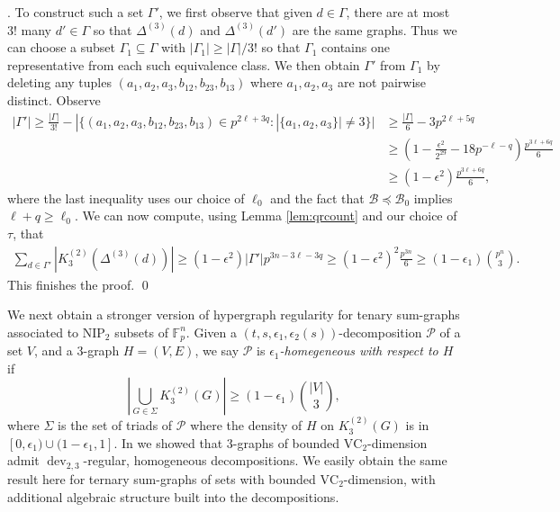 \documentclass[12pt,oneside,british,a4wide]{amsart}
\numberwithin{equation}{section}
\theoremstyle{definition}
\def\F{\mathbb{F}}
\def\NIP{\mathrm{NIP}}
\def\VC{\mathrm{VC}}
\def\e{\epsilon}
\newcommand{\calB}{\mathcal{B}}
\newcommand{\calP}{\mathcal{P}}
\def\dev{\operatorname{dev}}
\newenvironment{proofof}[1]{\indent{\itshape Proof of #1}.\;}{\qed}
\begin{document}
\begin{proofof}{Theorem \ref{thm:hypergraphreg}}
To construct such a set $\Gamma'$, we first observe that given $d\in \Gamma$, there are at most $3!$ many $d'\in \Gamma$ so that $\Delta^{(3)}(d)$ and $\Delta^{(3)}(d')$ are the same graphs.  Thus we can choose a subset $\Gamma_1\subseteq \Gamma$ with  $|\Gamma_1|\geq |\Gamma|/3!$ so that $\Gamma_1$ contains one representative from each such equivalence class.  We then obtain $\Gamma'$ from $\Gamma_1$ by deleting any tuples $(a_1,a_2,a_3,b_{12},b_{23},b_{13})$  where $a_1,a_2,a_3$ are not pairwise distinct. Observe 
\begin{align*}
|\Gamma'|\geq \frac{|\Gamma|}{3!}-|\{(a_1,a_2, a_3,b_{12},b_{23},b_{13})\in p^{2\ell+3q}: |\{a_1,a_2,a_3\}|\neq 3\}|&\geq \frac{|\Gamma|}{6}-3p^{2\ell+5q} \\
&\geq (1-\frac{\e^2}{2^{29}}- 18p^{-\ell-q})\frac{p^{3\ell+6q}}{6}\\
&\geq (1-\e^2)\frac{p^{3\ell+6q}}{6},
\end{align*}
where the last inequality uses our choice of $\ell_0$ and the fact that $\calB\preceq\calB_0$ implies $\ell+q\geq \ell_0$.  We can now compute, using Lemma \ref{lem:qrcount} and our choice of $\tau$, that
\begin{align*}
\sum_{d\in \Gamma'}|K_3^{(2)}(\Delta^{(3)}(d))|\geq (1-\e^2)|\Gamma'|p^{3n-3\ell-3q}\geq (1-\e^2)^2\frac{p^{3n}}{6}\geq (1-\e_1){p^n\choose 3}.
\end{align*}
This finishes the proof.
\end{proofof}

\vspace{2mm}

We next  obtain a stronger version of hypergraph regularity for tenary sum-graphs associated to $\NIP_2$ subsets of $\F_p^n$.  Given a $(t,s,\e_1,\e_2(s))$-decomposition $\calP$ of a set $V$, and a $3$-graph $H=(V,E)$, we say $\calP$ is \emph{$\e_1$-homegeneous with respect to $H$} if 
$$
|\bigcup_{G\in \Sigma}K_3^{(2)}(G)|\geq (1-\e_1){|V|\choose 3},
$$
where $\Sigma$ is the set of triads of $\calP$ where the density of $H$ on $K_3^{(2)}(G)$ is in  $[0,\e_1)\cup (1-\e_1,1]$.  In \cite[Theorem 2.23]{Terry.2021b} we showed that $3$-graphs of bounded $\VC_2$-dimension admit $\dev_{2,3}$-regular, homogeneous decompositions. We easily obtain the same result here for ternary sum-graphs of sets with bounded $\VC_2$-dimension, with additional algebraic structure built into the decompositions.
\end{document}
